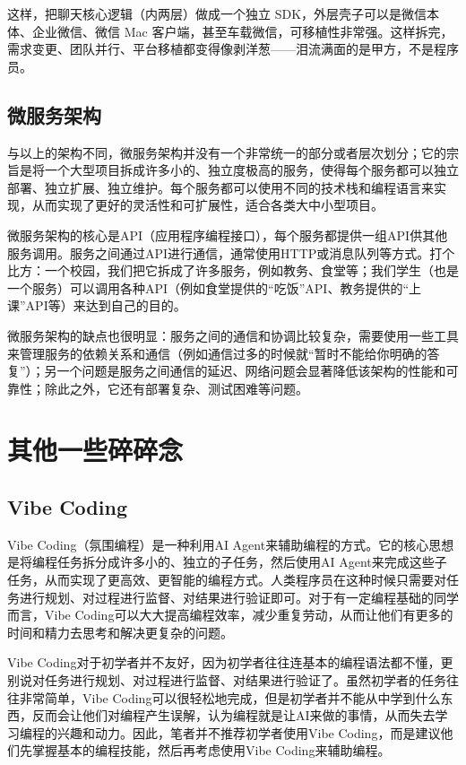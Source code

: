 这样，把聊天核心逻辑（内两层）做成一个独立 SDK，外层壳子可以是微信本体、企业微信、微信 Mac 客户端，甚至车载微信，可移植性非常强。这样拆完，需求变更、团队并行、平台移植都变得像剥洋葱——泪流满面的是甲方，不是程序员。

\subsection{微服务架构}

与以上的架构不同，微服务架构并没有一个非常统一的部分或者层次划分；它的宗旨是将一个大型项目拆成许多小的、独立度极高的服务，使得每个服务都可以独立部署、独立扩展、独立维护。每个服务都可以使用不同的技术栈和编程语言来实现，从而实现了更好的灵活性和可扩展性，适合各类大中小型项目。

微服务架构的核心是API（应用程序编程接口），每个服务都提供一组API供其他服务调用。服务之间通过API进行通信，通常使用HTTP或消息队列等方式。打个比方：一个校园，我们把它拆成了许多服务，例如教务、食堂等；我们学生（也是一个服务）可以调用各种API（例如食堂提供的“吃饭”API、教务提供的“上课”API等）来达到自己的目的。

微服务架构的缺点也很明显：服务之间的通信和协调比较复杂，需要使用一些工具来管理服务的依赖关系和通信（例如通信过多的时候就“暂时不能给你明确的答复”）；另一个问题是服务之间通信的延迟、网络问题会显著降低该架构的性能和可靠性；除此之外，它还有部署复杂、测试困难等问题。

\section{其他一些碎碎念}

\subsection{Vibe Coding}

Vibe Coding（氛围编程）是一种利用AI Agent来辅助编程的方式。它的核心思想是将编程任务拆分成许多小的、独立的子任务，然后使用AI Agent来完成这些子任务，从而实现了更高效、更智能的编程方式。人类程序员在这种时候只需要对任务进行规划、对过程进行监督、对结果进行验证即可。对于有一定编程基础的同学而言，Vibe Coding可以大大提高编程效率，减少重复劳动，从而让他们有更多的时间和精力去思考和解决更复杂的问题。

\begin{caution}
  Vibe Coding对于初学者并不友好，因为初学者往往连基本的编程语法都不懂，更别说对任务进行规划、对过程进行监督、对结果进行验证了。虽然初学者的任务往往非常简单，Vibe Coding可以很轻松地完成，但是初学者并不能从中学到什么东西，反而会让他们对编程产生误解，认为编程就是让AI来做的事情，从而失去学习编程的兴趣和动力。因此，笔者并不推荐初学者使用Vibe Coding，而是建议他们先掌握基本的编程技能，然后再考虑使用Vibe Coding来辅助编程。
\end{caution}

